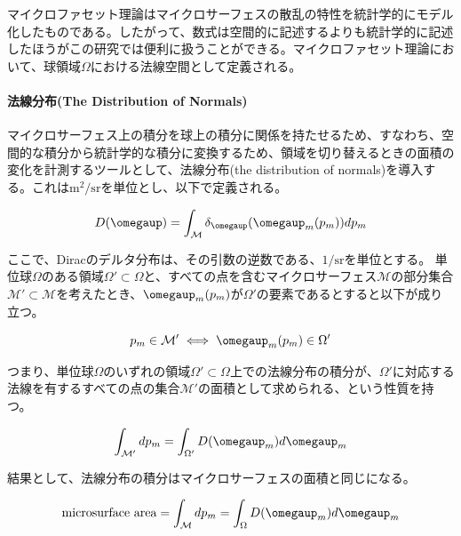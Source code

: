 \documentclass[a4j,xelatex,ja=standard]{bxjsarticle}
\begin{document}
マイクロファセット理論はマイクロサーフェスの散乱の特性を統計学的にモデル化したものである。したがって、数式は空間的に記述するよりも統計学的に記述したほうがこの研究では便利に扱うことができる。マイクロファセット理論において、球領域$\Omega$における法線空間として定義される。

\paragraph{法線分布(The Distribution of Normals)}

マイクロサーフェス上の積分を球上の積分に関係を持たせるため、すなわち、空間的な積分から統計学的な積分に変換するため、領域を切り替えるときの面積の変化を計測するツールとして、法線分布(the distribution of normals)を導入する。これは$\text{m}^2/\text{sr}$を単位とし、以下で定義される。

\begin{equation}
    D(\boldsymbol{\omegaup}) = \int_{\mathcal M}  \delta_{\boldsymbol{\omegaup}}(\boldsymbol{\omegaup}_m(p_m)) dp_m
    \label{eq:2}
\end{equation}

ここで、Diracのデルタ分布は、その引数の逆数である、$1/\text{sr}$を単位とする。
単位球$\Omega$のある領域$\Omega' \subset \Omega$と、すべての点を含むマイクロサーフェス$\mathcal M$の部分集合$\mathcal{M}' \subset \mathcal{M}$を考えたとき、$\boldsymbol{\omegaup}_m(p_m)$が$\Omega'$の要素であるとすると以下が成り立つ。

\begin{equation}
    p_m \in \mathcal{M}' \iff \boldsymbol{\omegaup}_m(p_m) \in \Omega'
    \label{eq:3}
\end{equation}

つまり、単位球$\Omega$のいずれの領域$\Omega' \subset \Omega$上での法線分布の積分が、$\Omega'$に対応する法線を有するすべての点の集合$\mathcal M'$の面積として求められる、という性質を持つ。

\begin{equation}
    \int_{\mathcal M'} dp_m = \int_{\Omega'} D(\boldsymbol{\omegaup}_m)d\boldsymbol{\omegaup}_m
    \label{eq:4}
\end{equation}

結果として、法線分布の積分はマイクロサーフェスの面積と同じになる。

\begin{equation}
    \text{microsurface area} = \int_{\mathcal M} dp_m = \int_{\Omega} D(\boldsymbol{\omegaup}_m)d\boldsymbol{\omegaup}_m
    \label{eq:5}
\end{equation}
\end{document}
